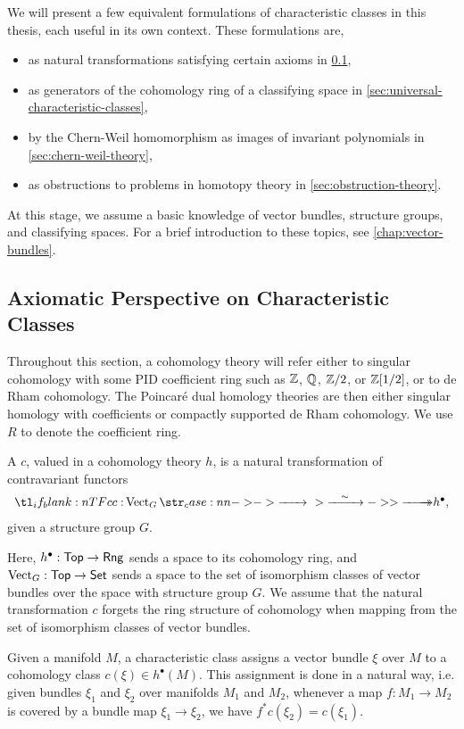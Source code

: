 We will present a few equivalent formulations of characteristic classes in this thesis, each useful in its own context. These formulations are,
\begin{itemize}
	\item as natural transformations satisfying certain axioms in \cref{sec:axiomatic-characteristic-classes},
	\item as generators of the cohomology ring of a classifying space in \cref{sec:universal-characteristic-classes},
	\item by the Chern-Weil homomorphism as images of invariant polynomials in \cref{sec:chern-weil-theory},
	\item as obstructions to problems in homotopy theory in \cref{sec:obstruction-theory}.
\end{itemize}
At this stage, we assume a basic knowledge of vector bundles, structure groups, and classifying spaces. For a brief introduction to these topics, see \cref{chap:vector-bundles}.

\subsection{Axiomatic Perspective on Characteristic Classes}\label{sec:axiomatic-characteristic-classes}

Throughout this section, a cohomology theory will refer either to singular cohomology with some PID coefficient ring such as $\mathbb{Z}$, $\mathbb{Q}$, $\mathbb{Z}/2$, or $\mathbb{Z}[1/2]$, or to de Rham cohomology. The Poincar\'e dual homology theories are then either singular homology with coefficients or compactly supported de Rham cohomology. We use $R$ to denote the coefficient ring.

\begin{definition}\label{defn:characteristic-class}
	A  $c$, valued in a cohomology theory $h$, is a natural transformation of contravariant functors
	\[
		\lkxfunc{c}{\Vect_G}{h^\bullet,}
	\]
	given a structure group $G$.
\end{definition}

Here, $h^\bullet : \mathsf{Top} \to \mathsf{Rng}$ sends a space to its  cohomology ring, and $\operatorname{Vect}_G : \mathsf{Top} \to \mathsf{Set}$ sends a space to the set of isomorphism classes of vector bundles over the space with structure group $G$. We assume that the natural transformation $c$ forgets the ring structure of cohomology when mapping from the set of isomorphism classes of vector bundles.

Given a manifold $M$, a characteristic class assigns a vector bundle $\xi$ over $M$ to a cohomology class $c(\xi)\in h^\bullet(M)$.
This assignment is done in a natural way, i.e. given bundles $\xi_1$ and $\xi_2$ over manifolds $M_1$ and $M_2$, whenever a map $f : M_1 \to M_2$ is covered by a bundle map $\xi_1 \to \xi_2$, we have $f^* c(\xi_2) = c(\xi_1)$.

